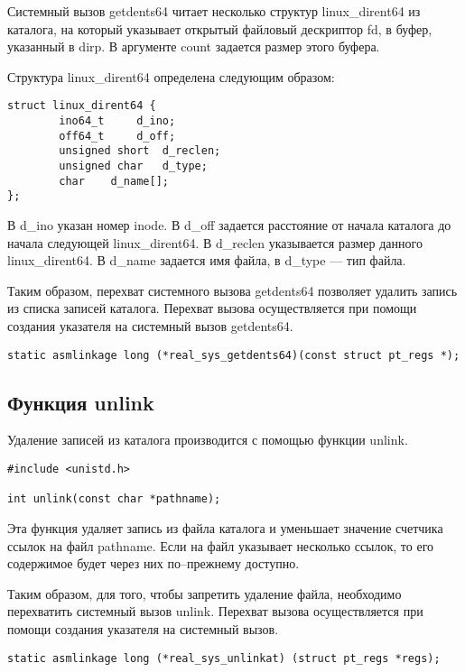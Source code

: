 Системный вызов getdents64 читает несколько структур linux\_dirent64 из каталога, на который указывает открытый файловый дескриптор fd, в буфер, указанный в dirp. В аргументе count задается размер этого буфера.

Структура linux\_dirent64 определена следующим образом:
\clearpage
\begin{lstlisting}[label=code:linuxdirent64,caption=Структура linux\_dirent64]
struct linux_dirent64 {
		ino64_t		d_ino;
		off64_t		d_off;    
		unsigned short	d_reclen; 
		unsigned char	d_type;  
		char	d_name[]; 
};
\end{lstlisting}

В d\_ino указан номер inode. В d\_off задается расстояние от начала каталога до начала следующей linux\_dirent64. В d\_reclen указывается размер данного linux\_dirent64. В d\_name задается имя файла, в d\_type --- тип файла.
 
Таким образом, перехват системного вызова getdents64 позволяет удалить запись из списка записей каталога.
Перехват вызова осуществляется при помощи создания указателя на системный вызов getdents64.

\begin{lstlisting}[label=code:getdents_p,caption=Указатель на getdents64]
static asmlinkage long (*real_sys_getdents64)(const struct pt_regs *);
\end{lstlisting}

\subsection{Функция unlink}

Удаление записей из каталога производится с помощью функции unlink.

\begin{lstlisting}[label=code:unlink,caption=Функция unlink]
#include <unistd.h>

int unlink(const char *pathname);
\end{lstlisting}

Эта функция удаляет запись из файла каталога и уменьшает значение счетчика ссылок на файл pathname. Если на файл указывает несколько ссылок, то его содержимое будет через них по--прежнему доступно.

Таким образом, для того, чтобы запретить удаление файла, необходимо перехватить системный вызов unlink.
Перехват вызова осуществляется при помощи создания указателя на системный вызов.

\begin{lstlisting}[label=code:unlink_p,caption=Указатель на unlink]
static asmlinkage long (*real_sys_unlinkat) (struct pt_regs *regs);
\end{lstlisting}



